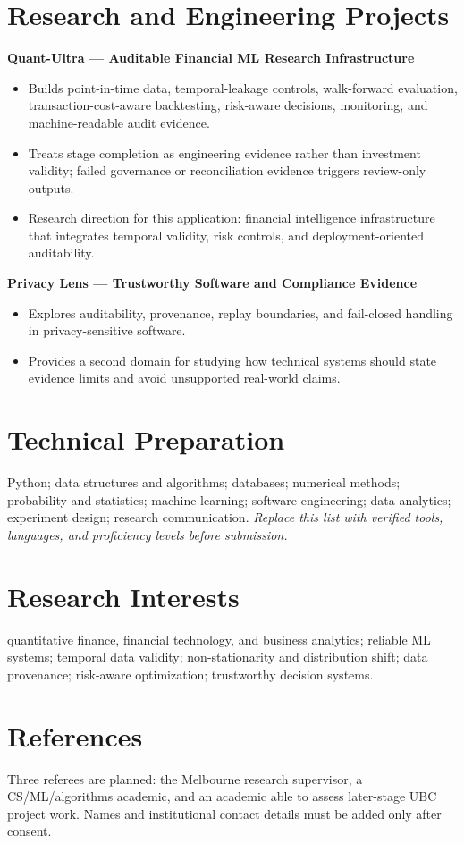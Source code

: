 \documentclass[11pt]{article}
\begin{document}
\section*{Research and Engineering Projects}
\textbf{Quant-Ultra --- Auditable Financial ML Research Infrastructure}
\begin{itemize}
\item Builds point-in-time data, temporal-leakage controls, walk-forward evaluation, transaction-cost-aware backtesting, risk-aware decisions, monitoring, and machine-readable audit evidence.
\item Treats stage completion as engineering evidence rather than investment validity; failed governance or reconciliation evidence triggers review-only outputs.
\item Research direction for this application: financial intelligence infrastructure that integrates temporal validity, risk controls, and deployment-oriented auditability.
\end{itemize}

\textbf{Privacy Lens --- Trustworthy Software and Compliance Evidence}
\begin{itemize}
\item Explores auditability, provenance, replay boundaries, and fail-closed handling in privacy-sensitive software.
\item Provides a second domain for studying how technical systems should state evidence limits and avoid unsupported real-world claims.
\end{itemize}

\section*{Technical Preparation}
Python; data structures and algorithms; databases; numerical methods; probability and statistics; machine learning; software engineering; data analytics; experiment design; research communication. \textit{Replace this list with verified tools, languages, and proficiency levels before submission.}

\section*{Research Interests}
quantitative finance, financial technology, and business analytics; reliable ML systems; temporal data validity; non-stationarity and distribution shift; data provenance; risk-aware optimization; trustworthy decision systems.

\section*{References}
Three referees are planned: the Melbourne research supervisor, a CS/ML/algorithms academic, and an academic able to assess later-stage UBC project work. Names and institutional contact details must be added only after consent.
\end{document}
